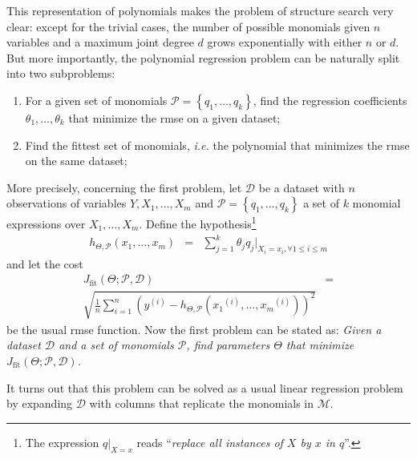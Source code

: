 \documentclass[preprint,authoryear,12pt]{elsarticle}
\newcommand{\sample}[1]{\ensuremath{^{\left(#1\right)}}}
\begin{document}
This representation of polynomials makes the problem of structure search very clear: except for the trivial cases, the number of possible monomials given $n$ variables and a maximum joint degree $d$ grows exponentially with either $n$ or $d$. But more importantly, the polynomial regression problem can be naturally split into two subproblems:
%
\begin{enumerate}
\item For a given set of monomials $\mathcal{P} = \left\lbrace q_1, \ldots, q_k\right\rbrace$, find the regression coefficients $\theta_1,\ldots,\theta_k$ that minimize the \ac{rmse} on a given dataset;

\item Find the fittest set of monomials, \emph{i.e.} the polynomial that minimizes the \ac{rmse} on the same dataset;
\end{enumerate}
%
More precisely, concerning the first problem, let $\mathcal{D}$ be a dataset with $n$ observations of variables $Y, X_1,\ldots,X_m$ and $\mathcal{P} = \left\lbrace q_1,\ldots, q_k\right\rbrace$ a set of $k$ monomial expressions over $X_1,\ldots,X_m$. Define the hypothesis\footnote{The expression $q|_{X=x}$ reads ``\emph{replace all instances of $X$ by $x$ in $q$}''.}
%
\begin{eqnarray*}
h_{\Theta,\mathcal{P}}\left(x_1,\ldots,x_m\right) &=& \sum_{j = 1}^k \theta_j q_j|_{X_i=x_i,\forall 1 \leq i \leq m}
\end{eqnarray*}
%
and let the cost
%
\begin{eqnarray}
J_{\textrm{fit}}\left(\Theta;\mathcal{P},\mathcal{D}\right)  & =  \nonumber \\
\sqrt{\frac{1}{n}\sum_{i=1}^n \left( y\sample{i} - h_{\Theta,\mathcal{P}}\left( x_1\sample{i},\ldots,x_m\sample{i} \right) \right)^2 }\label{eq:rmse}
\end{eqnarray}
%
be the usual \acf{rmse} function. Now the first problem can be stated as:
%
\emph{Given a dataset $\mathcal{D}$ and a set of monomials $\mathcal{P}$, find parameters $\Theta$ that minimize $J_{\textrm{fit}}\left(\Theta;\mathcal{P},\mathcal{D}\right)$.}

%
It turns out that this problem can be solved as a usual linear regression problem by expanding $\mathcal{D}$ with columns that replicate the monomials in $\mathcal{M}$.
\end{document}
